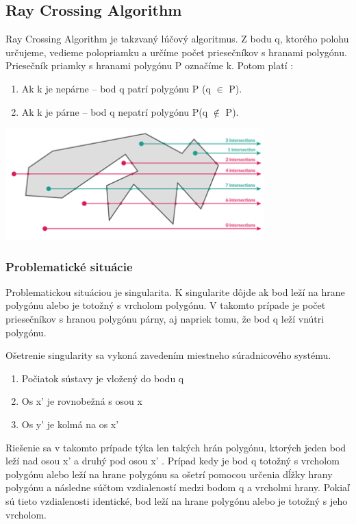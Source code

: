 \documentclass[12pt]{article}
\begin{document}
\subsection {Ray Crossing Algorithm}
Ray Crossing Algorithm je takzvaný lúčový algoritmus. Z bodu q, ktorého polohu určujeme, vedieme polopriamku a určíme počet priesečníkov s hranami polygónu. Priesečník priamky s hranami polygónu P označíme k. Potom platí :
\begin{enumerate}
\item Ak k je nepárne – bod q patrí polygónu P (q  $\in$ P).
\item Ak k je párne – bod q nepatrí polygónu P(q  $\notin$ P).
\end{enumerate}

\begin{center}
   \includegraphics[width=10cm]{./img/ray_algo.png}
\end{center}

\subsubsection {Problematické situácie}
Problematickou situáciou je singularita. K singularite dôjde ak bod leží na hrane polygónu alebo je totožný s vrcholom polygónu. V takomto prípade je počet priesečníkov s hranou polygónu párny, aj napriek tomu, že bod q leží vnútri polygónu.

Ošetrenie singularity sa vykoná zavedením miestneho súradnicového systému.
\begin{enumerate}
\item Počiatok sústavy je vložený do bodu q
\item Os x' je rovnobežná s osou x
\item Os y' je kolmá na os x'
\end{enumerate}	
Riešenie sa v takomto prípade týka len takých hrán polygónu, ktorých jeden bod leží nad osou x' a druhý pod osou x' . Prípad kedy je bod q totožný s vrcholom polygónu alebo leží na hrane polygónu sa ošetrí pomocou určenia dĺžky hrany polygónu a následne súčtom vzdialeností medzi bodom q a vrcholmi hrany. Pokiaľ sú tieto vzdialenosti identické, bod leží na hrane polygónu alebo je totožný s jeho vrcholom.
\end{document}
